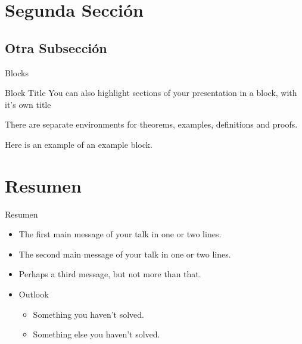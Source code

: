 \documentclass{beamer}
\begin{document}
\section{Segunda Sección}

\subsection{Otra Subsección}

\begin{frame}{Blocks}
\begin{block}{Block Title}
You can also highlight sections of your presentation in a block, with it's own title
\end{block}
\begin{theorem}
There are separate environments for theorems, examples, definitions and proofs.
\end{theorem}
\begin{example}
Here is an example of an example block.
\end{example}
\end{frame}

\section*{Resumen}

\begin{frame}{Resumen}
  \begin{itemize}
  \item
    The \alert{first main message} of your talk in one or two lines.
  \item
    The \alert{second main message} of your talk in one or two lines.
  \item
    Perhaps a \alert{third message}, but not more than that.
  \end{itemize}
  
  \begin{itemize}
  \item
    Outlook
    \begin{itemize}
    \item
      Something you haven't solved.
    \item
      Something else you haven't solved.
    \end{itemize}
  \end{itemize}
\end{frame}
\end{document}
